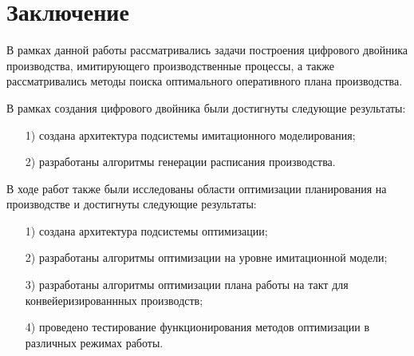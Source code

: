 
\section*{Заключение}
В рамках данной работы рассматривались задачи построения цифрового двойника производства, имитирующего
производственные процессы, а также рассматривались методы поиска оптимального оперативного плана производства.

В рамках создания цифрового двойника были достигнуты следующие результаты:

\begin{itemize}
    \item [1)] создана архитектура подсистемы имитационного моделирования;
    \item [2)] разработаны алгоритмы генерации расписания производства.
\end{itemize}

В ходе работ также были исследованы области оптимизации планирования на производстве и достигнуты следующие результаты:

\begin{itemize}
    \item [1)] создана архитектура подсистемы оптимизации;
    \item [2)] разработаны алгоритмы оптимизации на уровне имитационной модели;
    \item [3)] разработаны алгоритмы оптимизации плана работы на такт для конвейеризированнных производств;
    \item [4)] проведено тестирование функционирования методов оптимизации в различных режимах работы.
\end{itemize}